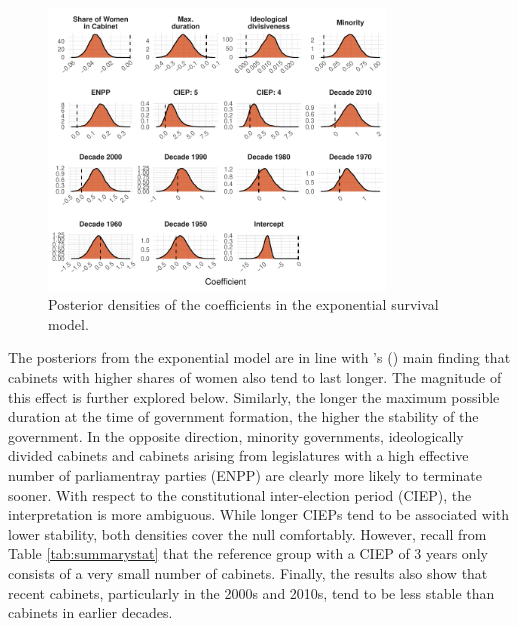 \documentclass[11pt]{article}
\newcommand\possecite[1]{\citeauthor{#1}'s (\citeyear{#1})}
\newcommand\minp[1]{\begin{minipage}{0.8\textwidth} #1 \end{minipage}}
\begin{document}
\begin{figure}[!ht]
    \centering
    \minp{\caption{Posterior densities of the coefficients in the exponential survival model.} \label{fig:exp_coefplot}}
    \includegraphics[width = 0.8\textwidth]{figures/fig1_exp_coefplot.pdf}
\end{figure}

The posteriors from the exponential model are in line with \possecite{KK20} main finding that cabinets with higher shares of women also tend to last longer. The magnitude of this effect is further explored below. Similarly, the longer the maximum possible duration at the time of government formation, the higher the stability of the government. In the opposite direction, minority governments, ideologically divided cabinets and cabinets arising from legislatures with a high effective number of parliamentray parties (ENPP) are clearly more likely to terminate sooner. With respect to the constitutional inter-election period (CIEP), the interpretation is more ambiguous. While longer CIEPs tend to be associated with lower stability, both densities cover the null comfortably. However, recall from Table \ref{tab:summarystat} that the reference group with a CIEP of 3 years only consists of a very small number of cabinets. Finally, the results also show that recent cabinets, particularly in the 2000s and 2010s, tend to be less stable than cabinets in earlier decades. 
\end{document}
